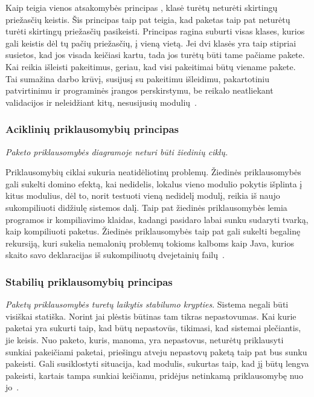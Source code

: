 Kaip teigia vienos atsakomybės principas , klasė turėtų neturėti skirtingų priežasčių keistis.
Šis principas taip pat teigia, kad paketas taip pat neturėtų turėti skirtingų priežasčių pasikeisti.
Principas ragina suburti visas klases, kurios gali keistis dėl tų pačių priežasčių, į vieną vietą.
Jei dvi klasės yra taip stipriai susietos, kad jos visada keičiasi kartu, tada
jos turėtų būti tame pačiame pakete.
Kai reikia išleisti pakeitimus, geriau, kad visi pakeitimai būtų viename pakete.
Tai sumažina darbo krūvį, susijusį su pakeitimu išleidimu, pakartotiniu patvirtinimu ir programinės įrangos perskirstymu,
be reikalo neatliekant validacijos ir neleidžiant kitų, nesusijusių modulių~\cite{AgileSoftwareDevelopment}.

\subsubsection{Aciklinių priklausomybių principas}
\textit{Paketo priklausomybės diagramoje neturi būti žiedinių ciklų.}

Priklausomybių ciklai sukuria neatidėliotinų problemų.
Žiedinės priklausomybės gali sukelti domino efektą, kai nedidelis, lokalus vieno modulio pokytis išplinta į kitus modulius,
dėl to, norit testuoti vieną nedidelį modulį, reikia iš naujo sukompiliuoti didžiulę sistemos dalį.
Taip pat žiedinės priklausomybės lemia programos ir kompiliavimo klaidas, kadangi pasidaro labai sunku sudaryti tvarką, kaip kompiliuoti paketus.
Žiedinės priklausomybės taip pat gali sukelti begalinę rekursiją,
kuri sukelia nemalonių problemų tokioms kalboms kaip Java, kurios skaito savo deklaracijas iš
sukompiliuotų dvejetainių failų~\cite{AgileSoftwareDevelopment}.


\subsubsection{Stabilių priklausomybių principas}
\textit{Paketų priklausomybės turetų laikytis stabilumo krypties}.
Sistema negali būti visiškai statiška.
Norint jai plėstis būtinas tam tikras nepastovumas.
Kai kurie paketai yra sukurti taip, kad būtų nepastovūs, tikimasi, kad sistemai plečiantis, jie keisis.
Nuo paketo, kuris, manoma, yra nepastovus, neturėtų priklausyti sunkiai pakeičiami paketai,
 priešingu atveju nepastovų paketą taip pat bus sunku pakeisti.
Gali susiklostyti situacija, kad modulis, sukurtas taip, kad jį būtų lengva pakeisti, kartais tampa sunkiai keičiamu,
pridėjus netinkamą priklausomybę nuo jo~\cite{AgileSoftwareDevelopment}.


